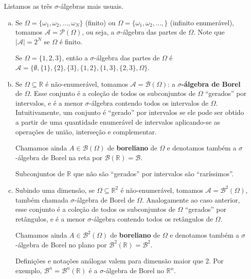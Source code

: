 \documentclass[../Notas.tex]{subfiles}
\begin{document}
Listamos as três $\sigma$-álgebras mais usuais.
\begin{enumerate}[(a)]
    \item Se $\Omega = \{ \omega_1, \omega_2, \dots, \omega_N \}$ (finito) ou $\Omega = \{ \omega_1, \omega_2, \dots, \}$ (infinito enumerável), tomamos $\mathcal{A} = \mathcal{P}(\Omega)$, ou seja, a $\sigma$-álgebra das partes de $\Omega$. Note que $|\mathcal{A}| = 2^N$ se $\Omega$ é finito.
    \begin{example}
    Se $\Omega = \{1,2,3\}$, então a $\sigma$-álgebra das partes de $\Omega$ é $\mathcal{A} = \{ \emptyset, \{1\}, \{2\}, \{3\}, \{1,2\}, \{1,3\}, \{2,3\}, \Omega \}$.
    \end{example}
    \item Se $\Omega\subseteq\mathbb{R}$ é não-enumerável, tomamos $\mathcal{A} = \mathcal{B}(\Omega)$: a {\bf $\sigma$-álgebra de Borel} de $\Omega$. Esse conjunto é a coleção de todos os subconjuntos de $\Omega$ ``gerados'' por intervalos, e é a menor $\sigma$-álgebra contendo todos os intervalos de $\Omega$. Intuitivamente, um conjunto é ``gerado'' por intervalos se ele pode ser obtido a partir de uma quantidade enumerável de intervalos aplicando-se as operações de união, interseção e complementar.
    
    Chamamos ainda $A\in\mathcal{B}(\Omega)$ de {\bf boreliano} de $\Omega$ e denotamos também a $\sigma$-álgebra de Borel na reta por $\mathcal{B}(\mathbb{R}) = \mathcal{B}$.
    \begin{remark}
    Subconjuntos de $\mathbb{R}$ que não são ``gerados'' por intervalos são ``raríssimos''. 
    \end{remark}
    \item Subindo uma dimensão, se $\Omega\subseteq\mathbb{R}^2$ é não-enumerável, tomamos $\mathcal{A} = \mathcal{B}^2(\Omega)$, também chamada $\sigma$-álgebra de Borel de $\Omega$. Analogamente ao caso anterior, esse conjunto é a coleção de todos os subconjuntos de $\Omega$ ``gerados'' por retângulos, e é a menor $\sigma$-álgebra contendo todos os retângulos de $\Omega$.
    
    Chamamos ainda $A\in\mathcal{B}^2(\Omega)$ de {\bf boreliano} de $\Omega$ e denotamos também a $\sigma$-álgebra de Borel no plano por $\mathcal{B}^2(\mathbb{R}) = \mathcal{B}^2$.
    \begin{remark}
    Definições e notações análogas valem para dimensão maior que 2. Por exemplo, $\mathcal{B}^n = \mathcal{B}^n(\mathbb{R})$ é a $\sigma$-álgebra de Borel no $\mathbb{R}^n$. 
    \end{remark}
\end{enumerate}
\end{document}
